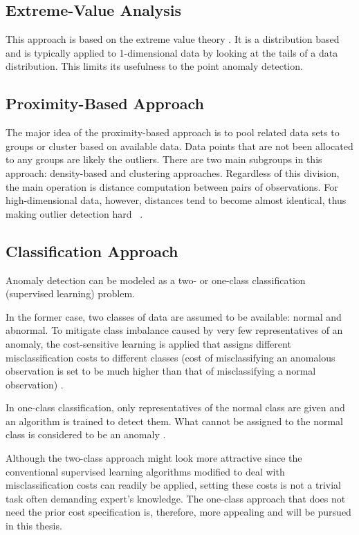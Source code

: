 \subsection{Extreme-Value Analysis}\label{extremevalue}
This approach is based on the extreme value theory \cite{Castillo:2004}. It is a distribution based and is typically applied to 1-dimensional data by looking at the tails of a data distribution. This limits its usefulness to the point anomaly detection.

\subsection{Proximity-Based Approach}\label{proximity}
The major idea of the proximity-based approach is to pool related data sets to groups or cluster based on available data. Data points that are not been allocated to any groups are likely the outliers. There are two main subgroups in this approach: density-based and clustering approaches. Regardless of this division, the main operation is distance computation between pairs of observations. For high-dimensional data, however, distances tend to become almost identical, thus making outlier detection hard ~\cite{Aggarwal:2013}. 

\subsection{Classification Approach}\label{classification}
Anomaly detection can be modeled as a two- or one-class classification (supervised learning) problem. 

In the former case, two classes of data are assumed to be available: normal and abnormal. To mitigate class imbalance caused by very few representatives of an anomaly, the cost-sensitive learning is applied that assigns different misclassification costs to different classes (cost of misclassifying an anomalous observation is set to be much higher than that of misclassifying a normal observation) \cite{Elkan:2001:FCL:1642194.1642224}.

In one-class classification, only representatives of the normal class are given and an algorithm is trained to detect them. What cannot be assigned to the normal class is considered to be an anomaly \cite{Amer:2013:EOS:2500853.2500857}.

Although the two-class approach might look more attractive since the conventional supervised learning algorithms modified to deal with misclassification costs can readily be applied, setting these costs is not a trivial task often demanding expert's knowledge. The one-class approach that does not need the prior cost specification is, therefore, more appealing and will be pursued in this thesis. 

